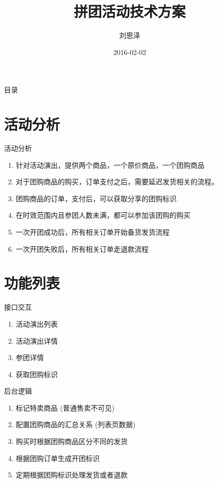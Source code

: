 \documentclass[presentation, bigger]{beamer}
\author{刘恩泽}
\date{2016-02-02}
\title{拼团活动技术方案}
\begin{document}
\maketitle
\begin{frame}{目录}
\tableofcontents
\end{frame}



\section{活动分析}
\label{sec:orgheadline2}

\begin{frame}[label={sec:orgheadline1}]{活动分析}
\begin{enumerate}
\item 针对活动演出，提供两个商品，一个原价商品，一个团购商品
\item 对于团购商品的购买，订单支付之后，需要延迟发货相关的流程。
\item 团购商品的订单，支付后，可以获取分享的团购标识.
\item 在时效范围内且参团人数未满，都可以参加该团购的购买
\item 一次开团成功后，所有相关订单开始备货发货流程
\item 一次开团失败后，所有相关订单走退款流程
\end{enumerate}
\end{frame}


\section{功能列表}
\label{sec:orgheadline5}

\begin{frame}[label={sec:orgheadline3}]{接口交互}
\begin{enumerate}
\item 活动演出列表
\item 活动演出详情
\item 参团详情
\item 获取团购标识
\end{enumerate}
\end{frame}


\begin{frame}[label={sec:orgheadline4}]{后台逻辑}
\begin{enumerate}
\item 标记特卖商品 (普通售卖不可见)
\item 配置团购商品的汇总关系 (列表页数据)
\item 购买时根据团购商品区分不同的发货
\item 根据团购订单生成开团标识
\item 定期根据团购标识处理发货或者退款
\end{enumerate}
\end{frame}
\end{document}
